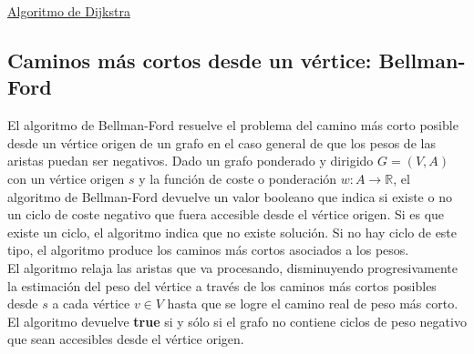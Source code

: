 \underline{Algoritmo de Dijkstra}\\


\subsection{Caminos más cortos desde un vértice: Bellman-Ford}
\label{sec:bellman}

El algoritmo de Bellman-Ford resuelve el problema del camino más corto posible desde un vértice origen de un grafo en el caso general de que los pesos de las aristas puedan ser negativos. Dado un grafo ponderado y dirigido $G = (V,A)$ con un vértice origen $s$ y la función de coste o ponderación $w: A \rightarrow \mathbb{R}$, el algoritmo de Bellman-Ford devuelve un valor booleano que indica si existe o no un ciclo de coste negativo que fuera accesible desde el vértice origen. Si es que existe un ciclo, el algoritmo indica que no existe solución. Si no hay ciclo de este tipo, el algoritmo produce los caminos más cortos asociados a los pesos.\\

El algoritmo relaja las aristas que va procesando, disminuyendo progresivamente la estimación del peso del vértice a través de los caminos más cortos posibles desde $s$ a cada vértice $v \in V$ hasta que se logre el camino real de peso más corto. El algoritmo devuelve \textbf{true} si y sólo si el grafo no contiene ciclos de peso negativo que sean accesibles desde el vértice origen.\\

\vfill
\pagebreak

